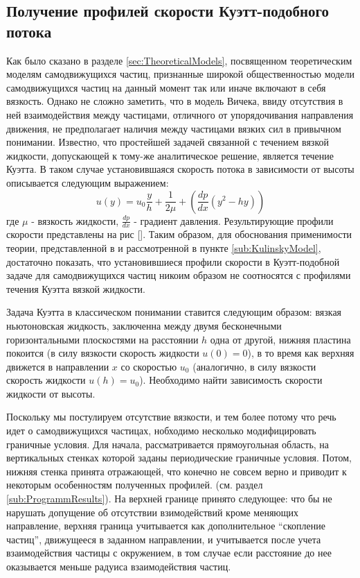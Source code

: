     \subsection{Получение профилей скорости Куэтт-подобного потока} %
    \label{sub:SpeedProfilesOfCouetteFlow}
        Как было сказано в разделе \ref{sec:TheoreticalModels}, посвященном теоретическим моделям самодвижущихся частиц, признанные широкой общественностью модели самодвижущихся частиц на данный момент так или иначе включают в себя вязкость. Однако не сложно заметить, что в модель Вичека, ввиду отсутствия в ней взаимодействия между частицами, отличного от упорядочивания направления движения, не предполагает наличия между частицами вязких сил в привычном понимании. Известно, что простейшей задачей связанной с течением вязкой жидкости, допускающей к тому-же аналитическое решение, является течение Куэтта. В таком случае установившаяся скорость потока в зависимости от высоты описывается следующим выражением:
        \begin{equation} \label{eq:CoetteFlow}
            u(y) = u_0 \frac{y}{h} + \frac{1}{2\mu} + (\frac{dp}{dx}(y^2 -hy))
        \end{equation}
        где $\mu$ - вязкость жидкости, $\frac{dp}{dx}$ - градиент давления. Результирующие профили скорости представлены на рис [].
        Таким образом, для обоснования применимости теории, представленной в \cite{chepizhko2013} и рассмотренной в пункте \ref{sub:KulinskyModel}, достаточно показать, что установившиеся профили скорости в Куэтт-подобной задаче для самодвижущихся частиц никоим образом не соотносятся с профилями течения Куэтта вязкой жидкости.

        Задача Куэтта в классическом понимании ставится следующим образом: вязкая ньютоновская жидкость, заключенна между двумя бесконечными горизонтальными плоскостями на расстоянии $h$ одна от другой, нижняя пластина покоится (в силу вязкости скорость жидкости $u(0) = 0$), в то время как верхняя движется в направлении $x$ со скоростью $u_0$ (аналогично, в силу вязкости скорость жидкости $u(h) = u_0$). Необходимо найти зависимость скорости жидкости от высоты.

        Поскольку мы постулируем отсутствие вязкости, и тем более потому что речь идет о самодвижущихся частицах, нобходимо несколько модифицировать граничные условия. Для начала, рассматривается прямоугольная область, на вертикальных стенках которой заданы периодические граничные условия. Потом, нижняя стенка принята отражающей, что конечно не совсем верно и приводит к некоторым особенностям полученных профилей. (см. раздел \ref{sub:ProgrammResults}). На верхней границе принято следующее: что бы не нарушать допущение об отсутствии взимодействий кроме меняющих направление, верхняя граница учитывается как дополнительное ``скопление частиц'', движущееся в заданном направлении, и учитывается после учета взаимодействия частицы с окружением, в том случае если расстояние до нее оказывается меньше радуиса взаимодействия частиц.
